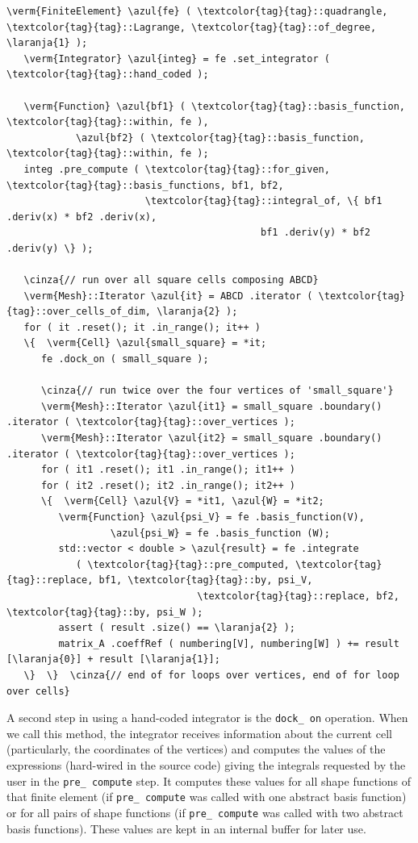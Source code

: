 \begin{Verbatim}[commandchars=\\\{\},formatcom=\small\tt,
   baselinestretch=0.94,framesep=2mm                      ]
   \verm{FiniteElement} \azul{fe} ( \textcolor{tag}{tag}::quadrangle, \textcolor{tag}{tag}::Lagrange, \textcolor{tag}{tag}::of_degree, \laranja{1} );
   \verm{Integrator} \azul{integ} = fe .set_integrator ( \textcolor{tag}{tag}::hand_coded );

   \verm{Function} \azul{bf1} ( \textcolor{tag}{tag}::basis_function, \textcolor{tag}{tag}::within, fe ),
            \azul{bf2} ( \textcolor{tag}{tag}::basis_function, \textcolor{tag}{tag}::within, fe );
   integ .pre_compute ( \textcolor{tag}{tag}::for_given, \textcolor{tag}{tag}::basis_functions, bf1, bf2,
                        \textcolor{tag}{tag}::integral_of, \{ bf1 .deriv(x) * bf2 .deriv(x),
                                            bf1 .deriv(y) * bf2 .deriv(y) \} );

   \cinza{// run over all square cells composing ABCD}
   \verm{Mesh}::Iterator \azul{it} = ABCD .iterator ( \textcolor{tag}{tag}::over_cells_of_dim, \laranja{2} );
   for ( it .reset(); it .in_range(); it++ )
   \{  \verm{Cell} \azul{small_square} = *it;
      fe .dock_on ( small_square );

      \cinza{// run twice over the four vertices of 'small_square'}
      \verm{Mesh}::Iterator \azul{it1} = small_square .boundary() .iterator ( \textcolor{tag}{tag}::over_vertices );
      \verm{Mesh}::Iterator \azul{it2} = small_square .boundary() .iterator ( \textcolor{tag}{tag}::over_vertices );
      for ( it1 .reset(); it1 .in_range(); it1++ )
      for ( it2 .reset(); it2 .in_range(); it2++ )
      \{  \verm{Cell} \azul{V} = *it1, \azul{W} = *it2;
         \verm{Function} \azul{psi_V} = fe .basis_function(V),
                  \azul{psi_W} = fe .basis_function (W);
         std::vector < double > \azul{result} = fe .integrate 
            ( \textcolor{tag}{tag}::pre_computed, \textcolor{tag}{tag}::replace, bf1, \textcolor{tag}{tag}::by, psi_V,
                                 \textcolor{tag}{tag}::replace, bf2, \textcolor{tag}{tag}::by, psi_W );
         assert ( result .size() == \laranja{2} );
         matrix_A .coeffRef ( numbering[V], numbering[W] ) += result [\laranja{0}] + result [\laranja{1}];
   \}  \}  \cinza{// end of for loops over vertices, end of for loop over cells}
\end{Verbatim}

A second step in using a hand-coded integrator is the {\small\tt dock\_\,on} operation.
When we call this method, the integrator receives information about the current cell
(particularly, the coordinates of the vertices)
and computes the values of the expressions (hard-wired in the source code) giving the integrals
requested by the user in the {\small\tt pre\_\,compute} step.
It computes these values for all shape functions of that finite element
(if {\small\tt pre\_\,compute} was called with one abstract basis function)
or for all pairs of shape functions (if {\small\tt pre\_\,compute} was called with two
abstract basis functions).
These values are kept in an internal buffer for later use.

